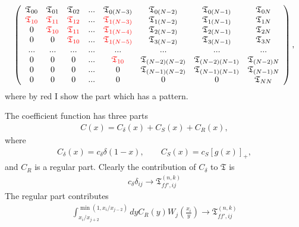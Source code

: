 \documentclass[prd,nofootinbib,eqsecnum,final]{revtex4}
\renewcommand{\(}{\left(}
\renewcommand{\)}{\right)}
\renewcommand{\[}{\left[}
\renewcommand{\]}{\right]}
\newcommand{\red}[1]{{\color[rgb]{1,0,0} #1}}
\begin{document}
\begin{eqnarray}
\left(
\begin{array}{cccccccc}
\mathfrak{T}_{00} & \mathfrak{T}_{01} & \mathfrak{T}_{02} & ... & \mathfrak{T}_{0(N-3)} & \mathfrak{T}_{0(N-2)} & \mathfrak{T}_{0(N-1)} & \mathfrak{T}_{0N}
\\
\red{\mathfrak{T}_{10}} & \red{\mathfrak{T}_{11}} & \red{\mathfrak{T}_{12}} & ... & \red{\mathfrak{T}_{1(N-3)}} & \mathfrak{T}_{1(N-2)} & \mathfrak{T}_{1(N-1)} & \mathfrak{T}_{1N}
\\
0 & \red{\mathfrak{T}_{10}} & \red{\mathfrak{T}_{11}} & ... & \red{\mathfrak{T}_{1(N-4)}} & \mathfrak{T}_{2(N-2)} & \mathfrak{T}_{2(N-1)} & \mathfrak{T}_{2N}
\\
0 & 0 & \red{\mathfrak{T}_{10}} & ... & \red{\mathfrak{T}_{1(N-5)}} & \mathfrak{T}_{3(N-2)} & \mathfrak{T}_{3(N-1)} & \mathfrak{T}_{3N}
\\ ... & ... &... &... &... &... &... &... 
\\
0 & 0 & 0 & ... & \red{\mathfrak{T}_{10}} & \mathfrak{T}_{(N-2)(N-2)} & \mathfrak{T}_{(N-2)(N-1)} & \mathfrak{T}_{(N-2)N}
\\
0 & 0 & 0 & ... & 0 & \mathfrak{T}_{(N-1)(N-2)} & \mathfrak{T}_{(N-1)(N-1)} & \mathfrak{T}_{(N-1)N}
\\
0 & 0 & 0 & ... & 0 & 0 & 0 & \mathfrak{T}_{NN}
\end{array}
\right),
\end{eqnarray}
where by red I show the part which has a pattern.

The coefficient function has three parts
\begin{eqnarray}
C(x)=C_\delta(x)+C_S(x)+C_R(x),
\end{eqnarray}
where
\begin{eqnarray}
C_\delta(x)=c_\delta \delta(1-x),\qquad
C_S(x)=c_S [g(x)]_+,
\end{eqnarray}
and $C_R$ is a regular part. Clearly the contribution of $C_\delta$ to $\mathfrak{T}$ is
\begin{eqnarray}
c_\delta \delta_{ij} \to \mathfrak{T}_{ff',ij}^{(n,k)}
\end{eqnarray}
The regular part contributes
\begin{eqnarray}
\int_{x_i/x_{j+2}}^{\min(1,x_i/x_{j-2})}dy C_R(y)W_j\(\frac{x_i}{y}\)\to \mathfrak{T}_{ff',ij}^{(n,k)}
\end{eqnarray}
\end{document}
